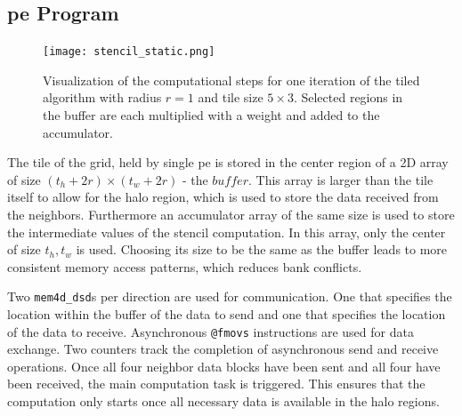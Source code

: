 \subsection{\ac{pe} Program}


\begin{figure}
    \centering
    \texttt{[image: stencil\_static.png]}
    \caption{Visualization of the computational steps for one iteration of the tiled algorithm with radius $r=1$ and tile size $5\times 3$. Selected regions in the buffer are each multiplied with a weight and added to the accumulator.}
    \label{fig:stencil_algorithm_animation}
\end{figure}

The tile of the grid, held by single \ac{pe} is stored in the center region of a 2D array of size $(t_h+2r)\times (t_w+2r)$ - the $buffer$. This array is larger than the tile itself to allow for the halo region, which is used to store the data received from the neighbors. Furthermore an accumulator array of the same size is used to store the intermediate values of the stencil computation. In this array, only the center of size $t_h, t_w$ is used. Choosing its size to be the same as the buffer leads to more consistent memory access patterns, which reduces bank conflicts.

Two \texttt{mem4d\_dsd}s per direction are used for communication. One that specifies the location within the buffer of the data to send and one that specifies the location of the data to receive.
Asynchronous \texttt{@fmovs} instructions are used for data exchange. Two counters track the completion of asynchronous send and receive operations. Once all four neighbor data blocks have been sent and all four have been received, the main computation task is triggered. This ensures that the computation only starts once all necessary data is available in the halo regions.

